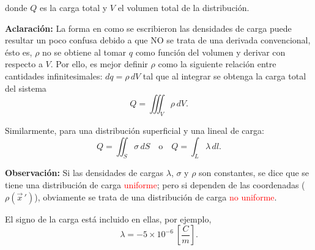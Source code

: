 donde $Q$ es la carga total y $V$ el volumen total de la distribución.

\textbf{Aclaración:} La forma en como se escribieron las densidades de carga puede resultar un poco confusa debido a que NO se trata de una derivada convencional, ésto es, $\rho$ no se obtiene al tomar $q$ como función del volumen y  derivar con respecto a $V$. Por ello, es mejor definir $\rho$ como la siguiente relación entre cantidades infinitesimales: $dq = \rho \,dV$ tal que al integrar se obtenga la carga total del sistema
$$Q = \iiint_V \rho \,dV.$$

Similarmente, para una distribución superficial y una lineal de carga:
$$Q = \iint_S \sigma\,dS \quad \text{o} \quad Q = \int_{L} \lambda \,dl.$$

\textbf{Observación:} Si las densidades de cargas $\lambda$, $\sigma$ y $\rho$ son constantes, se dice que se tiene una distribución de carga \textcolor{red}{uniforme}; pero si dependen de las coordenadas ($\rho(\vec{x}\,')$), obviamente se trata de una distribución de carga \textcolor{red}{no uniforme}.

El signo de la carga está incluido en ellas, por ejemplo,
\begin{equation*}
\lambda = -5 \times 10^{-6} ~ \left[ \frac{C}{m} \right].
\end{equation*}

